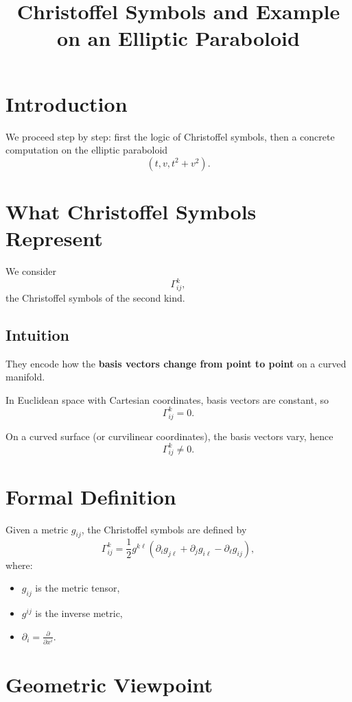 \documentclass[a4paper,11pt]{article}
\title{Christoffel Symbols and Example on an Elliptic Paraboloid}
\author{}
\date{}
\begin{document}
	
	\maketitle
	
	\section*{Introduction}
	
	We proceed step by step: first the logic of Christoffel symbols, then a concrete computation on the elliptic paraboloid
	\[
	(t,v,t^2+v^2).
	\]
	
	\section{What Christoffel Symbols Represent}
	
	We consider
	\[
	\Gamma^k_{ij},
	\]
	the Christoffel symbols of the second kind.
	
	\subsection*{Intuition}
	
	They encode how the \textbf{basis vectors change from point to point} on a curved manifold.
	
	In Euclidean space with Cartesian coordinates, basis vectors are constant, so
	\[
	\Gamma^k_{ij} = 0.
	\]
	
	On a curved surface (or curvilinear coordinates), the basis vectors vary, hence
	\[
	\Gamma^k_{ij} \neq 0.
	\]
	
	\section{Formal Definition}
	
	Given a metric $g_{ij}$, the Christoffel symbols are defined by
	\[
	\Gamma^k_{ij}
	=
	\frac{1}{2} g^{k\ell}
	\left(
	\partial_i g_{j\ell}
	+
	\partial_j g_{i\ell}
	-
	\partial_\ell g_{ij}
	\right),
	\]
	where:
	\begin{itemize}
		\item $g_{ij}$ is the metric tensor,
		\item $g^{ij}$ is the inverse metric,
		\item $\partial_i = \frac{\partial}{\partial x^i}$.
	\end{itemize}
	
	\section{Geometric Viewpoint}
	
\end{document}
